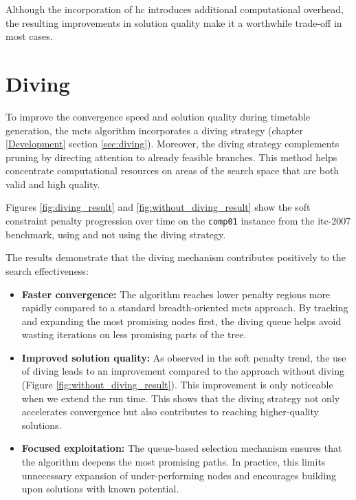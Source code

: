 Although the incorporation of \ac{hc} introduces additional computational overhead, the resulting improvements in solution quality make it a worthwhile trade-off in most cases.
   
\section{Diving}

To improve the convergence speed and solution quality during timetable generation, the \ac{mcts} algorithm incorporates a diving strategy (chapter \ref{Development} section \ref{sec:diving}). Moreover, the diving strategy complements pruning by directing attention to already feasible branches. This method helps concentrate computational resources on areas of the search space that are both valid and high quality.

Figures \ref{fig:diving_result} and \ref{fig:without_diving_result} show the soft constraint penalty progression over time on the \texttt{comp01} instance from the \ac{itc-2007} benchmark, using and not using the diving strategy.

The results demonstrate that the diving mechanism contributes positively to the search effectiveness:

\begin{itemize}
\item \textbf{Faster convergence:} The algorithm reaches lower penalty regions more rapidly compared to a standard breadth-oriented \ac{mcts} approach. By tracking and expanding the most promising nodes first, the diving queue helps avoid wasting iterations on less promising parts of the tree.

\item \textbf{Improved solution quality:} As observed in the soft penalty trend, the use of diving leads to an improvement compared to the approach without diving (Figure \ref{fig:without_diving_result}). This improvement is only noticeable when we extend the run time. This shows that the diving strategy not only accelerates convergence but also contributes to reaching higher-quality solutions.

\item \textbf{Focused exploitation:} The queue-based selection mechanism ensures that the algorithm deepens the most promising paths. In practice, this limits unnecessary expansion of under-performing nodes and encourages building upon solutions with known potential.
\end{itemize}

